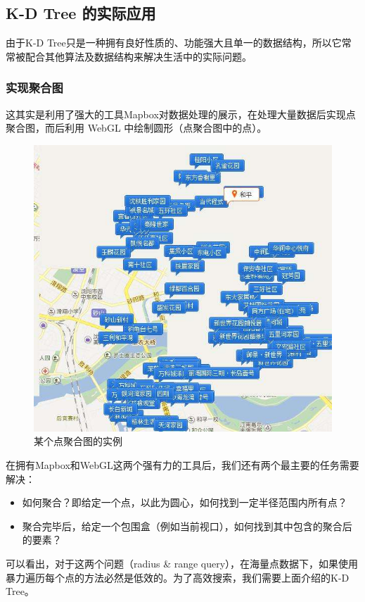 \documentclass{article}
\begin{document}
\subsection{K-D Tree 的实际应用}
由于K-D Tree只是一种拥有良好性质的、功能强大且单一的数据结构，所以它常常被配合其他算法及数据结构来解决生活中的实际问题。

\subsubsection{实现聚合图}
这其实是利用了强大的工具Mapbox对数据处理的展示，在处理大量数据后实现点聚合图，而后利用 WebGL 中绘制圆形（点聚合图中的点）。
\begin{figure}[h!]
\centering
\includegraphics[scale=0.5]{jhtt}
\caption{某个点聚合图的实例}
\label{fig:jhtt}
\end{figure} \par
在拥有Mapbox和WebGL这两个强有力的工具后，我们还有两个最主要的任务需要解决：\par
\begin{itemize}
    \item {如何聚合？即给定一个点，以此为圆心，如何找到一定半径范围内所有点？}
    \item {聚合完毕后，给定一个包围盒（例如当前视口），如何找到其中包含的聚合后的要素？}
\end{itemize} \par
可以看出，对于这两个问题（radius \& range query），在海量点数据下，如果使用暴力遍历每个点的方法必然是低效的。为了高效搜索，我们需要上面介绍的K-D Tree。
\end{document}
